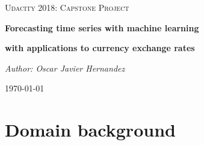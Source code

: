 \documentclass[10pt,a4paper]{article}
\begin{document}

\begin{titlepage}
	\centering
	\vspace{1cm}
	{\scshape\Large Udacity 2018: Capstone Project \par}
	\vspace{1.5cm}
	{\huge\bfseries Forecasting time series with machine learning\par}
	\vspace{1.5cm}
	{\large\bfseries with applications to currency exchange rates \par}
	\vspace{2cm}
	{\Large\itshape Author: Oscar Javier Hernandez\par}
	\vfill

	{\large \today\par}
\end{titlepage}


\section{Domain background}


\end{document}
